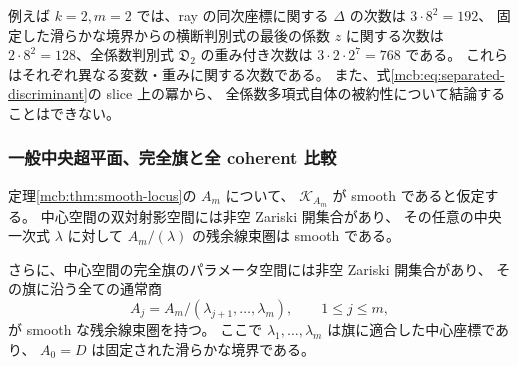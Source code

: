 例えば $k=2,m=2$ では、ray の同次座標に関する
$\Delta$ の次数は $3\cdot8^2=192$、
固定した滑らかな境界からの横断判別式の最後の係数 $z$ に関する次数は
$2\cdot8^2=128$、全係数判別式 $\mathfrak D_2$ の重み付き次数は
$3\cdot2\cdot2^7=768$ である。
これらはそれぞれ異なる変数・重みに関する次数である。
また、式\eqref{mcb:eq:separated-discriminant}の slice 上の冪から、
全係数多項式自体の被約性について結論することはできない。

\subsubsection{一般中央超平面、完全旗と全 coherent 比較}

\begin{theorem}[滑らかな対象の一般中央旗]
\label{mcb:thm:central-flags}
定理\ref{mcb:thm:smooth-locus}の $A_m$ について、
$\mathcal K_{A_m}$ が smooth であると仮定する。
中心空間の双対射影空間には非空 Zariski 開集合があり、
その任意の中央一次式 $\lambda$ に対して $A_m/(\lambda)$ の残余線束圏は smooth である。

さらに、中心空間の完全旗のパラメータ空間には非空 Zariski 開集合があり、
その旗に沿う全ての通常商
\[
 A_j=A_m/(\lambda_{j+1},\ldots,\lambda_m),\qquad 1\le j\le m,
\]
が smooth な残余線束圏を持つ。
ここで $\lambda_1,\ldots,\lambda_m$ は旗に適合した中心座標であり、
$A_0=D$ は固定された滑らかな境界である。
\end{theorem}

